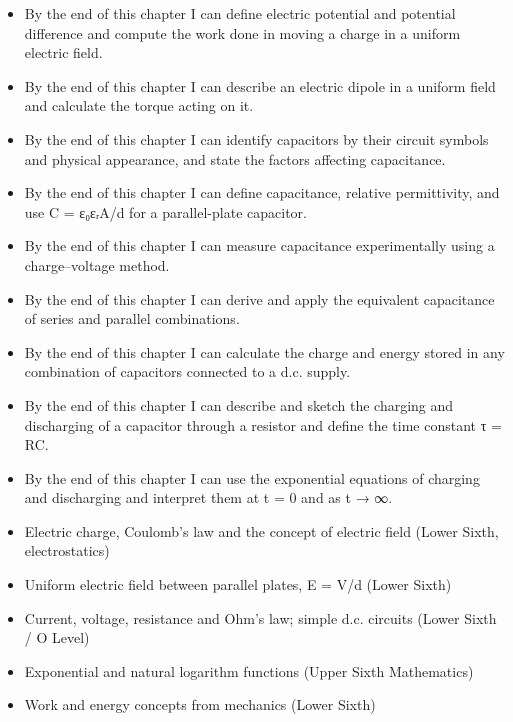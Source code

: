 \documentclass[11pt]{article}
\begin{document}
\begin{objectifs}
\begin{itemize}
\item By the end of this chapter I can define electric potential and potential difference and compute the work done in moving a charge in a uniform electric field.
\item By the end of this chapter I can describe an electric dipole in a uniform field and calculate the torque acting on it.
\item By the end of this chapter I can identify capacitors by their circuit symbols and physical appearance, and state the factors affecting capacitance.
\item By the end of this chapter I can define capacitance, relative permittivity, and use C = ε₀εᵣA/d for a parallel-plate capacitor.
\item By the end of this chapter I can measure capacitance experimentally using a charge–voltage method.
\item By the end of this chapter I can derive and apply the equivalent capacitance of series and parallel combinations.
\item By the end of this chapter I can calculate the charge and energy stored in any combination of capacitors connected to a d.c. supply.
\item By the end of this chapter I can describe and sketch the charging and discharging of a capacitor through a resistor and define the time constant τ = RC.
\item By the end of this chapter I can use the exponential equations of charging and discharging and interpret them at t = 0 and as t → ∞.
\end{itemize}
\end{objectifs}

\begin{prerequis}
\begin{itemize}
\item Electric charge, Coulomb's law and the concept of electric field (Lower Sixth, electrostatics)
\item Uniform electric field between parallel plates, E = V/d (Lower Sixth)
\item Current, voltage, resistance and Ohm's law; simple d.c. circuits (Lower Sixth / O Level)
\item Exponential and natural logarithm functions (Upper Sixth Mathematics)
\item Work and energy concepts from mechanics (Lower Sixth)
\end{itemize}
\end{prerequis}
\end{document}
